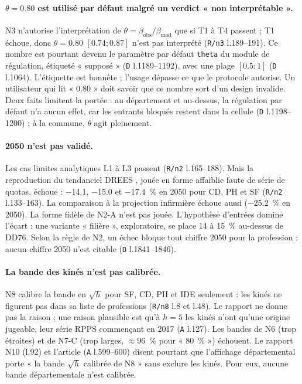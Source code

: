 \paragraph{$\theta = \num{0.80}$ est utilisé par défaut malgré un verdict « non interprétable ».}
N3 n'autorise l'interprétation de $\theta = \beta_{\text{obs}}/\beta_{\text{mod}}$ que si T1 à T4
passent ; T1 échoue, donc $\theta = \num{0.80}$ $[\num{0.74} ; \num{0.87}]$\mesure{} n'est pas
interprété (\texttt{R/n3} l.189--191). Ce nombre est pourtant devenu le paramètre par défaut
\texttt{theta} du module de régulation, étiqueté « supposé » (\texttt{D} l.1189--1192), avec une
plage $[\num{0.5} ; 1]$\suppose{} (\texttt{D} l.1064). L'étiquette est honnête ; l'usage dépasse
ce que le protocole autorise. Un utilisateur qui lit « \num{0.80} » doit savoir que ce nombre sort
d'un design invalide. Deux faits limitent la portée : au département et au-dessus, la régulation
par défaut n'a aucun effet, car les entrants bloqués restent dans la cellule (\texttt{D}
l.1198--1200) ; à la commune, $\theta$ agit pleinement.

\paragraph{2050 n'est pas validé.} Les cas limites analytiques L1 à L3 passent (\texttt{R/n2}
l.165--188). Mais la reproduction du tendanciel DREES \citep{drees2021dd76}, jouée en forme
affaiblie faute de série de quotas, échoue : \num{-14.1}\mesure, \num{-15.0}\mesure{} et
\num{-17.4}\mesure{}~\% en 2050 pour CD, PH et SF (\texttt{R/n2} l.133--163). La comparaison à la
projection infirmière \citep{er1319} échoue aussi (\num{-25.2}\mesure{}~\% en 2050). La forme
fidèle de N2-A n'est pas jouée. L'hypothèse d'entrées domine l'écart : une variante « filière »,
exploratoire, se place \num{+14} à \num{+15}\mesure{}~\% au-dessus de DD76. Selon la règle de N2,
un échec bloque tout chiffre 2050 pour la profession : aucun chiffre 2050 n'est citable
(\texttt{D} l.1841--1846).

\paragraph{La bande des kinés n'est pas calibrée.} N8 calibre la bande en $\sqrt h$ pour SF, CD, PH
et IDE seulement : les kinés ne figurent pas dans sa liste de professions (\texttt{R/n8} l.8
et l.48). Le rapport ne donne pas la raison ; une raison plausible est qu'à $h = 5$ les kinés n'ont
qu'une\derive{} origine jugeable, leur série RPPS commençant en 2017 (\texttt{A} l.127). Les bandes de N6 (trop étroites) et de N7-C (trop
larges, $\approx 96$\mesure{}~\% pour « 80~\% ») échouent. Le rapport N10 (l.92) et l'article
(\texttt{A} l.599--600) disent pourtant que l'affichage départemental porte « la bande $\sqrt h$
calibrée de N8 » sans exclure les kinés. Pour eux, aucune bande départementale n'est calibrée.

